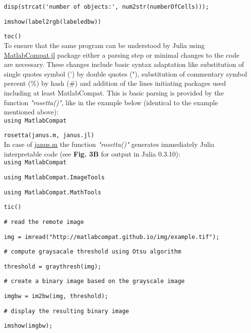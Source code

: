 \verb|disp(strcat('number of objects:', num2str(numberOfCells)));|

\verb|imshow(label2rgb(labeledbw))|

\verb|toc()|\\



To ensure that the same program can be understood by Julia using \href{https://github.com/MatlabCompat/MatlabCompat.jl}{MatlabCompat.jl} package either a parsing step or minimal changes to the code are necessary. These changes include basic syntax adaptation like substitution of single quotes symbol (') by double quotes ("), substitution of commentary symbol percent (\%) by hash (\#) and addition of the lines initiating packages used including at least MatlabCompat. This is basic parsing is provided by the function \textit{"rosetta()"}, like in the example below (identical to the example mentioned above):\\



\verb|using MatlabCompat|

\verb|rosetta(janus.m, janus.jl)|\\



In case of \href{https://github.com/MatlabCompat/MatlabCompat.jl/blob/dev/test/janus.m}{janus.m} the function \textit{"rosetta()"} generates immediately Julia interpretable code (see \textbf{Fig. 3B} for output in Julia 0.3.10):\\



\verb|using MatlabCompat|

\verb|using MatlabCompat.ImageTools|

\verb|using MatlabCompat.MathTools|

\verb|tic()|

\verb|# read the remote image|

\verb|img = imread("http://matlabcompat.github.io/img/example.tif");|

\verb|# compute graysacale threshold using Otsu algorithm|

\verb|threshold = graythresh(img);|

\verb|# create a binary image based on the grayscale image|

\verb|imgbw = im2bw(img, threshold);|

\verb|# display the resulting binary image|

\verb|imshow(imgbw);|

